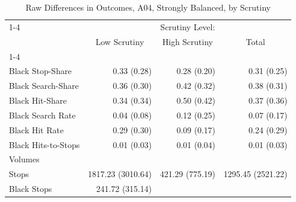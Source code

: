 \begin{table}[!h]
\caption{Raw Differences in Outcomes, A04, Strongly Balanced, by Scrutiny}
\centering
\begin{tabular}{llll}
\cline{1-4}
\multicolumn{1}{r}{} &
  \multicolumn{3}{c}{Scrutiny Level:} \\
\multicolumn{1}{r}{} &
  \multicolumn{1}{c}{Low Scrutiny} &
  \multicolumn{1}{c}{High Scrutiny} &
  \multicolumn{1}{c}{Total} \\
\cline{1-4}
\multicolumn{1}{l}{Rates} &
  \multicolumn{1}{r}{} &
  \multicolumn{1}{r}{} &
  \multicolumn{1}{r}{} \\
\multicolumn{1}{l}{\hspace{1em}Black Stop-Share} &
  \multicolumn{1}{r}{0.33 (0.28)} &
  \multicolumn{1}{r}{0.28 (0.20)} &
  \multicolumn{1}{r}{0.31 (0.25)} \\
\multicolumn{1}{l}{\hspace{1em}Black Search-Share} &
  \multicolumn{1}{r}{0.36 (0.30)} &
  \multicolumn{1}{r}{0.42 (0.32)} &
  \multicolumn{1}{r}{0.38 (0.31)} \\
\multicolumn{1}{l}{\hspace{1em}Black Hit-Share} &
  \multicolumn{1}{r}{0.34 (0.34)} &
  \multicolumn{1}{r}{0.50 (0.42)} &
  \multicolumn{1}{r}{0.37 (0.36)} \\
\multicolumn{1}{l}{\hspace{1em}Black Search Rate} &
  \multicolumn{1}{r}{0.04 (0.08)} &
  \multicolumn{1}{r}{0.12 (0.25)} &
  \multicolumn{1}{r}{0.07 (0.17)} \\
\multicolumn{1}{l}{\hspace{1em}Black Hit Rate} &
  \multicolumn{1}{r}{0.29 (0.30)} &
  \multicolumn{1}{r}{0.09 (0.17)} &
  \multicolumn{1}{r}{0.24 (0.29)} \\
\multicolumn{1}{l}{\hspace{1em}Black Hits-to-Stops} &
  \multicolumn{1}{r}{0.01 (0.03)} &
  \multicolumn{1}{r}{0.01 (0.04)} &
  \multicolumn{1}{r}{0.01 (0.03)} \\
\multicolumn{1}{l}{Volumes} &
  \multicolumn{1}{r}{} &
  \multicolumn{1}{r}{} &
  \multicolumn{1}{r}{} \\
\multicolumn{1}{l}{\hspace{1em}Stops} &
  \multicolumn{1}{r}{1817.23 (3010.64)} &
  \multicolumn{1}{r}{421.29 (775.19)} &
  \multicolumn{1}{r}{1295.45 (2521.22)} \\
\multicolumn{1}{l}{\hspace{1em}Black Stops} &
  \multicolumn{1}{r}{241.72 (315.14)} &

\end{tabular}
\end{table}
